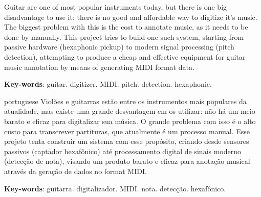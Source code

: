 \setlength{\absparsep}{18pt} %

\begin{summary}[Abstract]
  Guitar are one of most popular instruments today, but there is one big disadvantage
  to use it: there is no good and affordable way to digitize it's music. The
  biggest problem with this is the cost to annotate music, as it needs to be done
  by manually. This project tries to build one such system, starting from passive
  hardware (hexaphonic pickup) to modern signal processing (pitch detection),
  attempting to produce a cheap and effective equipment for guitar music annotation
  by means of generating MIDI format data.


  \textbf{Key-words}: guitar. digitizer. MIDI. pitch. detection. hexaphonic.
\end{summary}

\begin{summary}[Resumo]
  \begin{otherlanguage*}{portuguese}
    Violões e guitarras estão entre os instrumentos mais populares da atualidade,
    mas existe uma grande desvantagem em os utilizar: não há um meio barato e eficaz
    para digitalizar sua música. O grande problema com isso é o alto custo para
    transcrever partituras, que atualmente é um processo manual. Esse projeto tenta
    construir um sistema com esse propósito, criando desde sensores passivos (captador
    hexafônico) até processamento digital de sinais moderno (detecção de nota),
    visando um produto barato e eficaz para anotação musical através da geração de
    dados no format MIDI.

    \textbf{Key-words}: guitarra. digitalizador. MIDI. nota. detecção. hexafônico.
  \end{otherlanguage*}

\end{summary}

%
%
%
